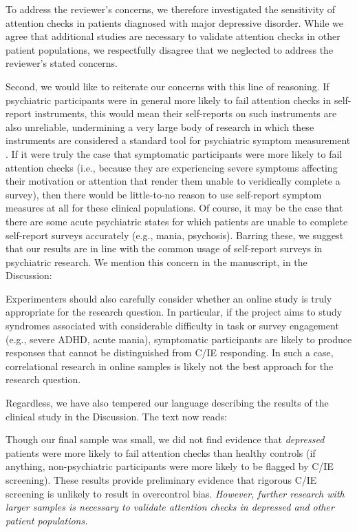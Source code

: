 \documentclass[a4paper,notitlepage,12pt]{article}
\begin{document}
To address the reviewer's concerns, we therefore investigated the sensitivity of attention checks in patients diagnosed with major depressive disorder. While we agree that additional studies are necessary to validate attention checks in other patient populations, we respectfully disagree that we neglected to address the reviewer's stated concerns.

Second, we would like to reiterate our concerns with this line of reasoning. If psychiatric participants were in general more likely to fail attention checks in self-report instruments, this would mean their self-reports on such instruments are also unreliable, undermining a very large body of research in which these instruments are considered a standard tool for psychiatric symptom measurement \cite{Demetriou2015-bq}. If it were truly the case that symptomatic participants were more likely to fail attention checks (i.e., because they are experiencing severe symptoms affecting their motivation or attention that render them unable to veridically complete a survey), then there would be little-to-no reason to use self-report symptom measures at all for these clinical populations. Of course, it may be the case that there are some acute psychiatric states for which patients are unable to complete self-report surveys accurately (e.g., mania, psychosis). Barring these, we suggest that our results are in line with the common usage of self-report surveys in psychiatric research. We mention this concern in the manuscript, in the Discussion:

\begin{displayquote}
Experimenters should also carefully consider whether an online study is truly appropriate for the research question. In particular, if the project aims to study syndromes associated with considerable difficulty in task or survey engagement (e.g., severe ADHD, acute mania), symptomatic participants are likely to produce responses that cannot be distinguished from C/IE responding. In such a case, correlational research in online samples is likely not the best approach for the research question.
\end{displayquote}

Regardless, we have also tempered our language describing the results of the clinical study in the Discussion. The text now reads:

\begin{displayquote}
    Though our final sample was small, we did not find evidence that \textit{depressed} patients were more likely to fail attention checks than healthy controls (if anything, non-psychiatric participants were more likely to be flagged by C/IE screening). These results provide preliminary evidence that rigorous C/IE screening is unlikely to result in overcontrol bias. \textit{However, further research with larger samples is necessary to validate attention checks in depressed and other patient populations.} 
\end{displayquote}
\end{document}
